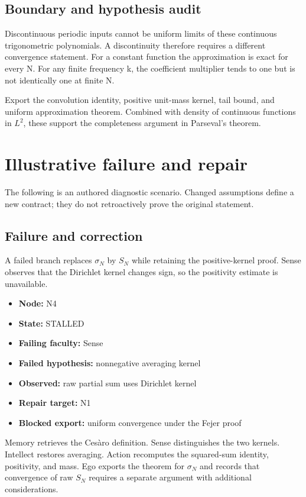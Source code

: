 \documentclass[preprint,12pt,aps,pra,showkeys,amsmath,amssymb,superscriptaddress,floatfix]{revtex4-2}
\theoremstyle{definition}
\theoremstyle{remark}
\begin{document}
\subsection{Boundary and hypothesis audit}

Discontinuous periodic inputs cannot be uniform limits of these
continuous trigonometric polynomials. A discontinuity therefore requires
a different convergence statement. For a constant function the
approximation is exact for every N. For any finite frequency k, the
coefficient multiplier tends to one but is not identically one at finite
N.

Export the convolution identity, positive unit-mass kernel, tail bound,
and uniform approximation theorem. Combined with density of continuous
functions in \(L^{2}\), these support the completeness argument in
Parseval's theorem.

\section{Illustrative failure and repair}

The following is an authored diagnostic scenario. Changed assumptions
define a new contract; they do not retroactively prove the original
statement.

\subsection{Failure and correction}
A failed branch replaces \(\sigma _N\) by \(S_N\) while retaining the
positive-kernel proof. Sense observes that the Dirichlet kernel changes
sign, so the positivity estimate is unavailable.

\begin{itemize}
\item
  \textbf{Node:} N4
\item
  \textbf{State:} STALLED
\item
  \textbf{Failing faculty:} Sense
\item
  \textbf{Failed hypothesis:} nonnegative averaging kernel
\item
  \textbf{Observed:} raw partial sum uses Dirichlet kernel
\item
  \textbf{Repair target:} N1
\item
  \textbf{Blocked export:} uniform convergence under the Fejer proof
\end{itemize}

Memory retrieves the Cesàro definition. Sense distinguishes the two
kernels. Intellect restores averaging. Action recomputes the squared-sum
identity, positivity, and mass. Ego exports the theorem for
\(\sigma _N\) and records that convergence of raw \(S_N\) requires a
separate argument with additional considerations.
\end{document}
